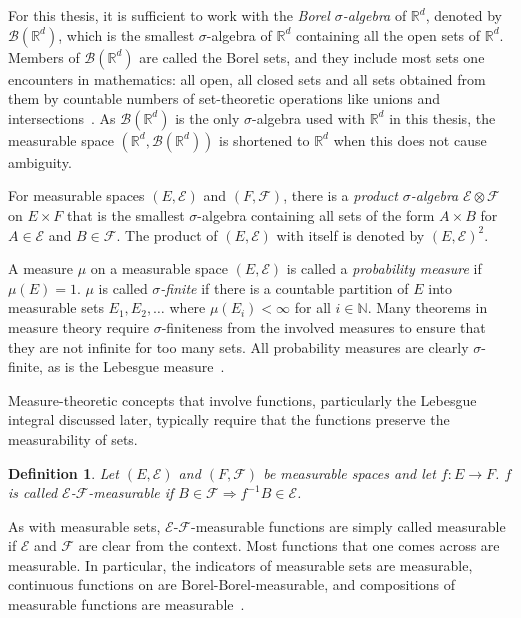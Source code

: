 \documentclass[english,twoside,openright]{HYgraduMLDS}
\newtheorem{definition}{Definition}
\newcommand{\R}{\mathbb{R}}
\newcommand{\N}{\mathbb{N}}
\begin{document}
For this thesis, it is sufficient to
work with the \emph{Borel \(\sigma\)-algebra} of \(\R^{d}\), denoted by
\(\mathcal{B}(\R^{d})\), which is
the smallest \(\sigma\)-algebra of \(\R^{d}\) containing all the open sets
of \(\R^{d}\). Members of \(\mathcal{B}(\R^{d})\) are called the Borel sets,
and they include most sets one encounters in mathematics: all open, all closed
sets and all sets obtained from them by countable numbers of set-theoretic
operations like unions and intersections~\cite{Cin11}. As \(\mathcal{B}(\R^{d})\) is the
only \(\sigma\)-algebra used with \(\R^{d}\) in this thesis, the measurable space
\((\R^{d}, \mathcal{B}(\R^{d}))\) is shortened to \(\R^{d}\) when this does not
cause ambiguity.

For measurable spaces \((E, \mathcal{E})\) and \((F, \mathcal{F})\),
there is a \emph{product \(\sigma\)-algebra} \(\mathcal{E}\otimes \mathcal{F}\)
on \(E\times F\) that is the smallest \(\sigma\)-algebra containing
all sets of the form \(A\times B\) for \(A\in \mathcal{E}\) and
\(B\in\mathcal{F}\). The product of \((E, \mathcal{E})\) with itself
is denoted by \((E, \mathcal{E})^{2}\).

A measure \(\mu\) on a measurable space \((E, \mathcal{E})\) is called
a \emph{probability measure} if \(\mu(E) = 1\). \(\mu\) is called
\emph{\(\sigma\)-finite} if there is a countable partition of \(E\)
into measurable sets \(E_{1}, E_{2},\dotsc\) where \(\mu(E_{i}) < \infty\)
for all \(i\in \N\).
Many theorems in measure theory require \(\sigma\)-finiteness from the involved
measures to ensure that they are not infinite for too many sets.
All probability measures are clearly \(\sigma\)-finite, as is the Lebesgue
measure~\cite{Cin11}.

Measure-theoretic concepts that involve functions, particularly the
Lebesgue integral discussed later, typically require that the functions
preserve the measurability of sets.
\begin{definition}
	Let \((E, \mathcal{E})\) and \((F, \mathcal{F})\) be measurable spaces
  and let \(f\colon E\to F\). \(f\) is called
  \(\mathcal{E}\)-\(\mathcal{F}\)-measurable if
  \(B\in \mathcal{F}\Rightarrow f^{-1}B\in \mathcal{E}\).
\end{definition}
As with measurable sets, \(\mathcal{E}\)-\(\mathcal{F}\)-measurable functions
are simply called measurable if \(\mathcal{E}\) and \(\mathcal{F}\) are
clear from the context.
Most functions that one comes across are measurable. In particular,
the indicators of measurable sets are measurable, continuous functions on
are Borel-Borel-measurable, and compositions of measurable functions
are measurable~\cite{Cin11}.
\end{document}
